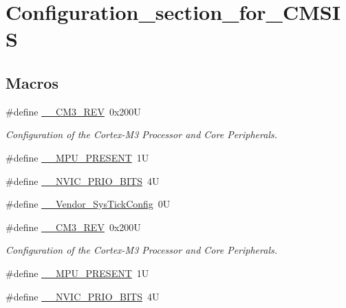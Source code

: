 \hypertarget{group___configuration__section__for___c_m_s_i_s}{\section{Configuration\-\_\-section\-\_\-for\-\_\-\-C\-M\-S\-I\-S}
\label{group___configuration__section__for___c_m_s_i_s}
}
\subsection*{Macros}
\begin{DoxyCompactItemize}
\item 
\#define \hyperlink{group___configuration__section__for___c_m_s_i_s_gac6a3f185c4640e06443c18b3c8d93f53}{\-\_\-\-\_\-\-C\-M3\-\_\-\-R\-E\-V}~0x200\-U
\begin{DoxyCompactList}\small\item\em Configuration of the Cortex-\/\-M3 Processor and Core Peripherals. \end{DoxyCompactList}\item 
\#define \hyperlink{group___configuration__section__for___c_m_s_i_s_ga4127d1b31aaf336fab3d7329d117f448}{\-\_\-\-\_\-\-M\-P\-U\-\_\-\-P\-R\-E\-S\-E\-N\-T}~1\-U
\item 
\#define \hyperlink{group___configuration__section__for___c_m_s_i_s_gae3fe3587d5100c787e02102ce3944460}{\-\_\-\-\_\-\-N\-V\-I\-C\-\_\-\-P\-R\-I\-O\-\_\-\-B\-I\-T\-S}~4\-U
\item 
\#define \hyperlink{group___configuration__section__for___c_m_s_i_s_gab58771b4ec03f9bdddc84770f7c95c68}{\-\_\-\-\_\-\-Vendor\-\_\-\-Sys\-Tick\-Config}~0\-U
\item 
\#define \hyperlink{group___configuration__section__for___c_m_s_i_s_gac6a3f185c4640e06443c18b3c8d93f53}{\-\_\-\-\_\-\-C\-M3\-\_\-\-R\-E\-V}~0x200\-U
\begin{DoxyCompactList}\small\item\em Configuration of the Cortex-\/\-M3 Processor and Core Peripherals. \end{DoxyCompactList}\item 
\#define \hyperlink{group___configuration__section__for___c_m_s_i_s_ga4127d1b31aaf336fab3d7329d117f448}{\-\_\-\-\_\-\-M\-P\-U\-\_\-\-P\-R\-E\-S\-E\-N\-T}~1\-U
\item 
\#define \hyperlink{group___configuration__section__for___c_m_s_i_s_gae3fe3587d5100c787e02102ce3944460}{\-\_\-\-\_\-\-N\-V\-I\-C\-\_\-\-P\-R\-I\-O\-\_\-\-B\-I\-T\-S}~4\-U

\end{DoxyCompactItemize}
